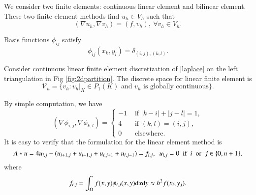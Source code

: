 We consider two finite elements: continuous linear element and
bilinear element. These two finite element methods find $u_h\in V_h$
such that
\begin{equation}\label{Discrete:2d}
(\nabla u_h, \nabla v_h)=(f, v_h),\ \forall v_h\in V_h.
\end{equation}


Basis functions $\phi_{ij}$ satisfy 
\begin{equation}
  \label{NodalBasis}
\phi_{ij}(x_k,y_l)=\delta_{(i,j),(k,l)}.  
\end{equation}

Consider continuous linear finite element discretization of \eqref{laplace} on
the left triangulation in Fig \ref{fig:2dpartition}. The discrete
space for linear finite element is
$$
\mathcal V_h=\{v_h: v_h|_K\in P_1(K) \text{ and } v_h \text{ is globally continuous}\}.
$$ 

By simple computation, we have
\begin{equation}
(\nabla \phi_{i,j} , \nabla \phi_{k,l})=
\left\{
		\begin{array}{ll}
		-1 & \mbox{ if } |k-i|+|j-l|= 1,\\     
		4 & \mbox{ if } (k,l)=(i,j),\\
		0& \mbox{ elsewhere}.
		\end{array}
		\right.
\end{equation}
It is easy to verify that the formulation for the linear element method is 
\begin{equation}
  \label{2d-fe0}
A\ast u=4u_{i,j}-(u_{i+1,j}+u_{i-1,j}+u_{i,j+1}+u_{i,j-1})=f_{i,j},~~u_{i,j}=0~~\hbox{if}~~i ~~\hbox{or}~~ j\in \{0, n+1\},
\end{equation}
where 
\begin{equation}\label{fij_fe}
f_{i,j} = \int_{\Omega} f(x,y)\phi_{i,j}(x,y) {\rm d}x {\rm d}y \approx h^2 f(x_i, y_j).
\end{equation} 

